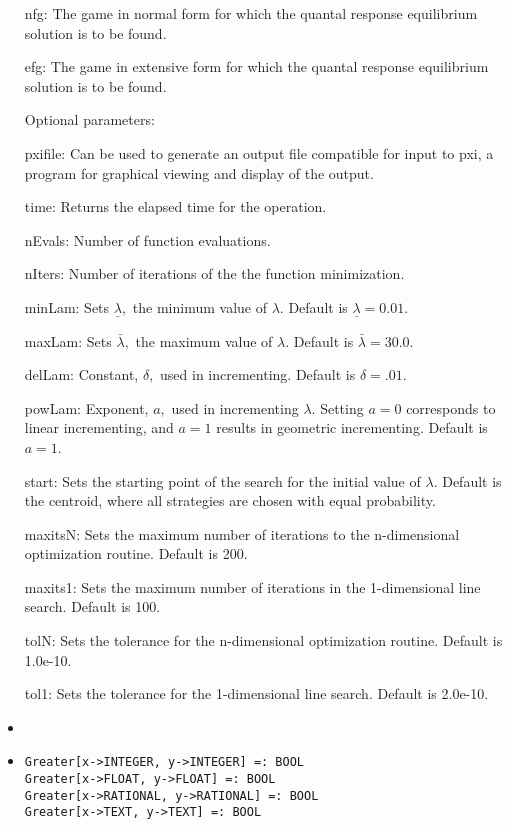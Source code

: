 \begin{itemize}
\bd
\item
[nfg:] The game in normal form for which the quantal response
equilibrium solution is to be
found.
\item	
[efg:] The game in extensive form for which the quantal response
equilibrium solution is to be found.
\ed

\item
[Optional parameters:]\hfil\null

\bd
\item
[pxifile:] Can be used to generate an output file compatible for input
to pxi, a program for graphical viewing and display of the output.  
\item
[time:] Returns the elapsed time for the operation.
\item
[nEvals:] Number of function evaluations.
\item
[nIters:] Number of iterations of the the function minimization.
\item
[minLam:] Sets $\underline\lambda,$ the minimum value of $\lambda.$
Default is $\underline\lambda = 0.01$.
\item
[maxLam:] Sets $\bar\lambda,$ the maximum value of $\lambda.$  Default is
$\bar\lambda = 30.0.$
\item
[delLam:]  Constant, $\delta,$ used in incrementing.   Default is
$\delta = .01.$
\item
[powLam:] Exponent, $a,$ used in incrementing $\lambda.$  Setting $a = 0$
corresponds to linear incrementing, and $a = 1$ results in geometric
incrementing.  Default is $a = 1$.
\item
[start:] Sets the starting point of the search for the initial value of
$\lambda.$  Default is the centroid, where all strategies are chosen
with equal probability.  
\item
[maxitsN:] Sets the maximum number of iterations to the
n-dimensional optimization routine.  Default is 200.
\item
[maxits1:] Sets the maximum number of iterations in the
1-dimensional line search.  Default is 100.
\item
[tolN:] Sets the tolerance for the n-dimensional optimization
routine.  Default is 1.0e-10.
\item
[tol1:] Sets the tolerance for the 1-dimensional line search.
Default is 2.0e-10.
\item
\ed
\ed

\item
\protect \large \begin{verbatim}
Greater[x->INTEGER, y->INTEGER] =: BOOL
Greater[x->FLOAT, y->FLOAT] =: BOOL
Greater[x->RATIONAL, y->RATIONAL] =: BOOL
Greater[x->TEXT, y->TEXT] =: BOOL
\end{verbatim}\normalsize


\end{itemize}
